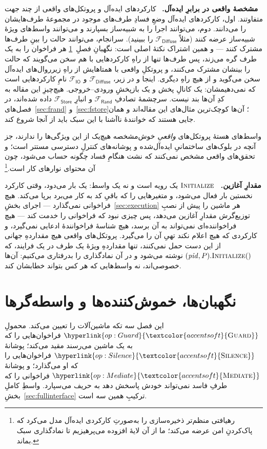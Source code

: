 \documentclass[10pt,oneside,openany]{book}
\newcommand{\PID}{\mathit{pid}}
\newcommand{\op}[1]{\textnormal{\textsc{#1}}}
\newcommand{\opl}[1]{\hyperlink{op:#1}{\textcolor{accentsoft}{\op{#1}}}}
\newcommand{\Frand}{\mathcal{F}_{\mathsf{Rand}}}
\newcommand{\Fstore}{\mathcal{F}_{\mathsf{Store}}}
\newcommand{\Fio}{\mathcal{F}_{\mathsf{IO}}}
\newcommand{\Fdiffuse}{\mathcal{F}_{\mathsf{Diffuse}}}
\newcommand{\heading}[1]{\medskip\par\noindent\textcolor{accent}{\textbf{#1.}}\ }
\theoremstyle{accentdef}
\theoremstyle{accentplain}
\begin{document}
\heading{مشخصهٔ واقعی در برابرِ ایده‌آل} کارکردهای ایده‌آل و پروتکل‌های
واقعی از چند جهت متفاوتند. اول، کارکردهای ایده‌آل وضعِ فسادِ طرف‌های
موجود در مجموعهٔ طرف‌هایشان را می‌دانند. دوم، می‌توانند اجرا را به
شبیه‌ساز بسپارند و می‌توانند واسط‌های ویژهٔ شبیه‌ساز عرضه کنند (مثلاً
$\Fdiffuse$ را ببینید). سرانجام، می‌توانند حالت را بینِ طرف‌ها مشترک کنند
--- و همین اشتراک نکتهٔ اصلی است: نگهبانِ فصلِ~\ref{sec:wrappers} هر
فراخوان را به یک طرف گره می‌زند، پس طرف‌ها تنها از راهِ کارکردهایی با هم
سخن می‌گویند که حالت را بینشان مشترک می‌کنند، و پروتکلِ واقعی با همتاهایش
از راهِ زیرروال‌های ایده‌آل سخن می‌گوید و از هیچ راهِ دیگری. اینجا و در
زیر، $\Fdiffuse$ و $\Fio$ نامِ کارکردهایی است که نمی‌دهیمشان: یک کانالِ
پخش و یک بازپخشِ ورودی--خروجی. هیچ‌چیزِ این مقاله به کدِ آن‌ها بند نیست.
سرچشمهٔ تصادفِ $\Frand$ و انبارِ $\Fstore$ داده شده‌اند، در
فصل‌های~\ref{sec:frand} و~\ref{sec:fstore}؛ آن‌ها کوچک‌ترین مثال‌های این
مقاله‌اند و همان جایی هستند که خوانندهٔ ناآشنا با این سبک باید از آنجا
شروع کند.

واسط‌های هستهٔ پروتکل‌های \emph{واقعیِ} خوش‌مشخصه هیچ‌یک از این ویژگی‌ها
را ندارند، جز آنچه در بلوک‌های ساختمانیِ ایده‌آل‌شده و پوشانه‌های کنترلِ
دسترسی مستتر است؛ و تحقق‌های واقعی مشخص نمی‌کنند که نشت هنگامِ فساد چگونه
حساب می‌شود، چون آن محتوای نوارهای کار
است.\footnote{رهیافتی منظم‌تر ذخیره‌سازی را به‌صورتِ کارکردی ایده‌آل مدل
می‌کرد که پاک‌کردنِ امن عرضه می‌کند؛ ما از آن لایهٔ افزوده می‌پرهیزیم تا
نمادگذاری سبک بماند.}

\heading{مقدارِ آغازین} $\op{Initialize}$ یک رویه است و نه یک واسط: یک بار
می‌دود، وقتی کارکرد نخستین بار فعال می‌شود، و متغیرهایی را که باقیِ کد به
کار می‌برد برپا می‌کند. هیچ فراخوانی نمی‌گذارد --- اجرای
بخشِ~\ref{sec:execution} هر ماشین را پیش از نصبِ توزیع‌گرش مقدارِ آغازین
می‌دهد، پس چیزی نبود که فراخوانی را خدمت کند --- هیچ فراخواننده‌ای
نمی‌تواند به آن برسد، هیچ شناسهٔ فراخوانندهٔ ادعایی نمی‌گیرد، و کارکردی که
هیچ اعلام نکند تهیِ آن را می‌گیرد. پروتکل‌های واقعی هیچ مقداردهِ جهانی از
این دست حمل نمی‌کنند، تنها مقداردهِ ویژهٔ یک طرف در یک فرایند، که
$(\PID,P).\op{Initialize}()$ نوشته می‌شود و در آن نمادگذاری را بدرفتاری
می‌کنیم: آن‌ها خصوصی‌اند، نه واسط‌هایی که هر کس بتواند خطابشان کند.

\chapter{نگهبان‌ها، خموش‌کننده‌ها و واسطه‌گرها}\label{sec:wrappers}

این فصل سه تکه ماشین‌آلات را تعیین می‌کند. محمولِ $\opl{Guard}$
فراخوان‌هایی را که به یک ماشین می‌رسند مقید می‌کند؛ پوشانهٔ
$\opl{Silence}$ فراخوان‌هایی را که او می‌گذارد؛ و پوشانهٔ $\opl{Mediate}$
فراخوانی را که طرفِ فاسد نمی‌تواند خودش پاسخش دهد به حریف می‌سپارد. واسطِ
کاملِ بخشِ~\ref{sec:fullinterface} ترکیبِ همین سه است.
\end{document}
